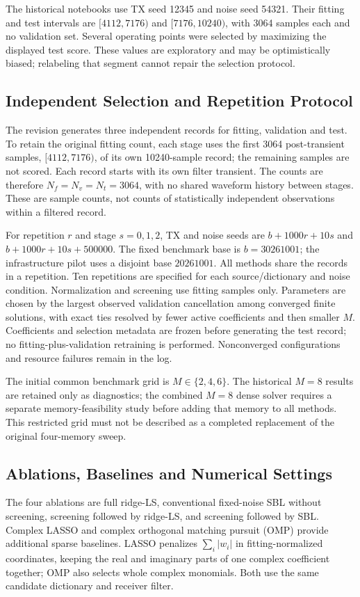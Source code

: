 \documentclass[conference]{IEEEtran}
\begin{document}
The historical notebooks use TX seed 12345 and noise seed 54321. Their fitting and test intervals are $[4112,7176)$ and $[7176,10240)$, with 3064 samples each and no validation set. Several operating points were selected by maximizing the displayed test score. These values are exploratory and may be optimistically biased; relabeling that segment cannot repair the selection protocol.

\subsection{Independent Selection and Repetition Protocol}\label{sec:selection}
The revision generates three independent records for fitting, validation and test. To retain the original fitting count, each stage uses the first 3064 post-transient samples, $[4112,7176)$, of its own 10240-sample record; the remaining samples are not scored. Each record starts with its own filter transient. The counts are therefore $N_f=N_v=N_t=3064$, with no shared waveform history between stages. These are sample counts, not counts of statistically independent observations within a filtered record.

For repetition $r$ and stage $s=0,1,2$, TX and noise seeds are $b+1000r+10s$ and $b+1000r+10s+500000$. The fixed benchmark base is $b=30261001$; the infrastructure pilot uses a disjoint base $20261001$. All methods share the records in a repetition. Ten repetitions are specified for each source/dictionary and noise condition. Normalization and screening use fitting samples only. Parameters are chosen by the largest observed validation cancellation among converged finite solutions, with exact ties resolved by fewer active coefficients and then smaller $M$. Coefficients and selection metadata are frozen before generating the test record; no fitting-plus-validation retraining is performed. Nonconverged configurations and resource failures remain in the log.

The initial common benchmark grid is $M\in\{2,4,6\}$. The historical $M=8$ results are retained only as diagnostics; the combined $M=8$ dense solver requires a separate memory-feasibility study before adding that memory to all methods. This restricted grid must not be described as a completed replacement of the original four-memory sweep.

\subsection{Ablations, Baselines and Numerical Settings}
The four ablations are full ridge-LS, conventional fixed-noise SBL without screening, screening followed by ridge-LS, and screening followed by SBL. Complex LASSO and complex orthogonal matching pursuit (OMP) provide additional sparse baselines. LASSO penalizes $\sum_i|w_i|$ in fitting-normalized coordinates, keeping the real and imaginary parts of one complex coefficient together; OMP also selects whole complex monomials. Both use the same candidate dictionary and receiver filter.
\end{document}
